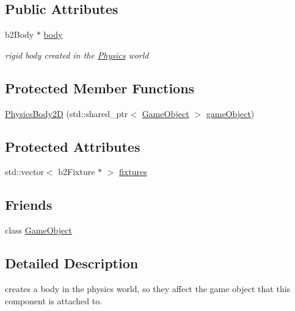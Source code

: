 \subsection*{Public Attributes}
\begin{DoxyCompactItemize}
\item 
b2\+Body $\ast$ \hyperlink{class_mason_1_1_physics_body2_d_abd02e269a86d5b760966a33eefa918d9}{body}
\begin{DoxyCompactList}\small\item\em rigid body created in the \hyperlink{class_mason_1_1_physics}{Physics} world \end{DoxyCompactList}\end{DoxyCompactItemize}
\subsection*{Protected Member Functions}
\begin{DoxyCompactItemize}
\item 
\hyperlink{class_mason_1_1_physics_body2_d_a70f168ce81ef424d8c7eac3f199f9c2b}{Physics\+Body2D} (std\+::shared\+\_\+ptr$<$ \hyperlink{class_mason_1_1_game_object}{Game\+Object} $>$ \hyperlink{class_mason_1_1_component_abaa67b569d0a70e26a4606f4a099a925}{game\+Object})
\end{DoxyCompactItemize}
\subsection*{Protected Attributes}
\begin{DoxyCompactItemize}
\item 
std\+::vector$<$ b2\+Fixture $\ast$ $>$ \hyperlink{class_mason_1_1_physics_body2_d_a73a0ad2e2b91022137c6ba8abe1fb51b}{fixtures}
\end{DoxyCompactItemize}
\subsection*{Friends}
\begin{DoxyCompactItemize}
\item 
class \hyperlink{class_mason_1_1_physics_body2_d_a00df87c957d8f7ee0fc51f07a0542f4a}{Game\+Object}
\end{DoxyCompactItemize}


\subsection{Detailed Description}
creates a body in the physics world, so they affect the game object that this component is attached to. 

